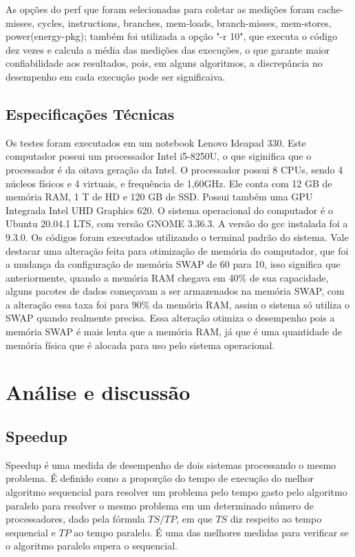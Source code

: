 \documentclass[journal]{IEEEtran}
\begin{document}
As opções do perf que foram selecionadas para coletar as medições foram cache-misses, cycles, instructions, branches, mem-loads, branch-misses, mem-stores, power(energy-pkg); também foi utilizada a opção "-r 10", que executa o código dez vezes e calcula a média das medições das execuções, o que garante maior confiabilidade aos resultados, pois, em alguns algoritmos, a discrepância no desempenho em cada execução pode ser significaiva.
\subsection{Especificações Técnicas}
Os testes foram executados em um notebook Lenovo Ideapad 330. Este computador possui um processador Intel i5-8250U, o que siginifica que o processador é da oitava geração da Intel. O processador possui 8 CPUs, sendo 4 núcleos físicos e 4 virtuais, e frequência de 1,60GHz. Ele conta com 12 GB de memória RAM, 1 T de HD e 120 GB de SSD. Possui também uma GPU Integrada Intel UHD Graphics 620. 
O sistema operacional do computador é o Ubuntu 20.04.1 LTS, com versão GNOME 3.36.3. A versão do gcc instalada foi a 9.3.0. Os códigos foram executados utilizando o terminal padrão do sistema. Vale destacar uma alteração feita para otimização de memória do computador, que foi a mudança da configuração de memória SWAP de 60 para 10, isso significa que anteriormente, quando a memória RAM chegava em 40\% de sua capacidade, alguns pacotes de dados começavam a ser armazenados na memória SWAP, com a alteração essa taxa foi para 90\% da memória RAM, assim o sistema só utiliza o SWAP quando realmente precisa. Essa alteração otimiza o desempenho pois a memória SWAP é mais lenta que a memória RAM, já que é uma quantidade de memória física que é alocada para uso pelo sistema operacional.


\section{Análise e discussão}

\subsection{Speedup}\label{speedup}
Speedup é uma medida de desempenho de dois sistemas processando o mesmo problema. É definido como a proporção do tempo de execução do melhor algoritmo sequencial para resolver um problema pelo tempo gasto pelo algoritmo paralelo para resolver o mesmo problema em um determinado número de processadores, dado pela fórmula $TS/TP$, em que $TS$ diz respeito ao tempo sequencial e $TP$ ao tempo paralelo. É uma das melhores medidas para verificar se o algoritmo paralelo supera o sequencial.
\end{document}
